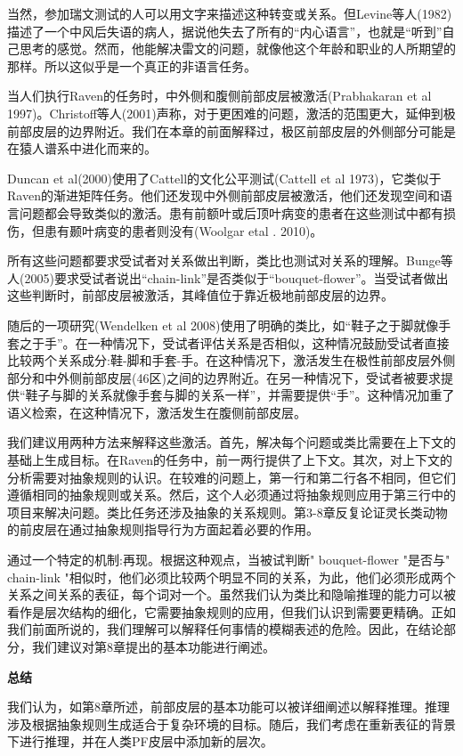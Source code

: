 当然，参加瑞文测试的人可以用文字来描述这种转变或关系。但Levine等人(1982)描述了一个中风后失语的病人，据说他失去了所有的“内心语言”，也就是“听到”自己思考的感觉。然而，他能解决雷文的问题，就像他这个年龄和职业的人所期望的那样。所以这似乎是一个真正的非语言任务。

当人们执行Raven的任务时，中外侧和腹侧前部皮层被激活(Prabhakaran et al 1997)。Christoff等人(2001)声称，对于更困难的问题，激活的范围更大，延伸到极前部皮层的边界附近。我们在本章的前面解释过，极区前部皮层的外侧部分可能是在猿人谱系中进化而来的。

Duncan et al(2000)使用了Cattell的文化公平测试(Cattell et al 1973)，它类似于Raven的渐进矩阵任务。他们还发现中外侧前部皮层被激活，他们还发现空间和语言问题都会导致类似的激活。患有前额叶或后顶叶病变的患者在这些测试中都有损伤，但患有颞叶病变的患者则没有(Woolgar etal . 2010)。

所有这些问题都要求受试者对关系做出判断，类比也测试对关系的理解。Bunge等人(2005)要求受试者说出“chain-link”是否类似于“bouquet-flower”。当受试者做出这些判断时，前部皮层被激活，其峰值位于靠近极地前部皮层的边界。

随后的一项研究(Wendelken et al 2008)使用了明确的类比，如“鞋子之于脚就像手套之于手”。在一种情况下，受试者评估关系是否相似，这种情况鼓励受试者直接比较两个关系成分:鞋-脚和手套-手。在这种情况下，激活发生在极性前部皮层外侧部分和中外侧前部皮层(46区)之间的边界附近。在另一种情况下，受试者被要求提供“鞋子与脚的关系就像手套与脚的关系一样”，并需要提供“手”。这种情况加重了语义检索，在这种情况下，激活发生在腹侧前部皮层。

我们建议用两种方法来解释这些激活。首先，解决每个问题或类比需要在上下文的基础上生成目标。在Raven的任务中，前一两行提供了上下文。其次，对上下文的分析需要对抽象规则的认识。在较难的问题上，第一行和第二行各不相同，但它们遵循相同的抽象规则或关系。然后，这个人必须通过将抽象规则应用于第三行中的项目来解决问题。类比任务还涉及抽象的关系规则。第3-8章反复论证灵长类动物的前皮层在通过抽象规则指导行为方面起着必要的作用。

通过一个特定的机制:再现。根据这种观点，当被试判断" bouquet-flower "是否与" chain-link "相似时，他们必须比较两个明显不同的关系，为此，他们必须形成两个关系之间关系的表征，每个词对一个。虽然我们认为类比和隐喻推理的能力可以被看作是层次结构的细化，它需要抽象规则的应用，但我们认识到需要更精确。正如我们前面所说的，我们理解可以解释任何事情的模糊表述的危险。因此，在结论部分，我们建议对第8章提出的基本功能进行阐述。

\textbf{总结}

我们认为，如第8章所述，前部皮层的基本功能可以被详细阐述以解释推理。推理涉及根据抽象规则生成适合于复杂环境的目标。随后，我们考虑在重新表征的背景下进行推理，并在人类PF皮层中添加新的层次。

